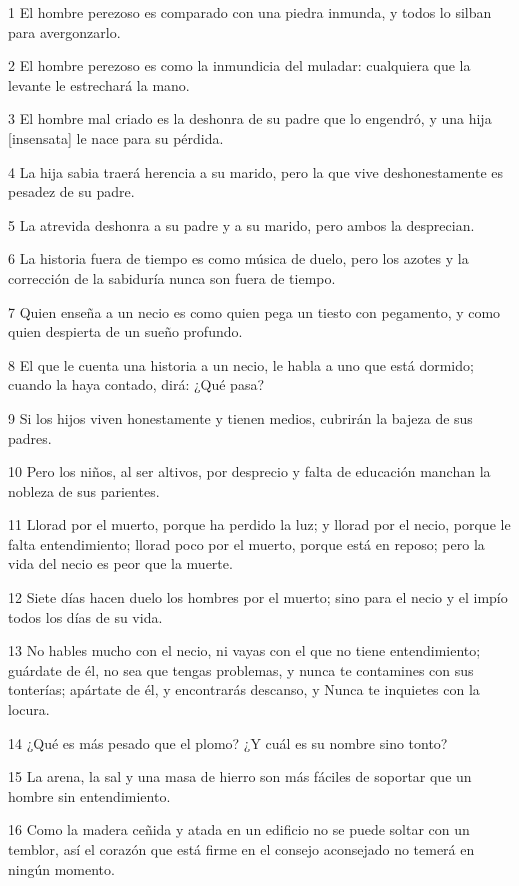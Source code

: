 \par 1 El hombre perezoso es comparado con una piedra inmunda, y todos lo silban para avergonzarlo.
\par 2 El hombre perezoso es como la inmundicia del muladar: cualquiera que la levante le estrechará la mano.
\par 3 El hombre mal criado es la deshonra de su padre que lo engendró, y una hija [insensata] le nace para su pérdida.
\par 4 La hija sabia traerá herencia a su marido, pero la que vive deshonestamente es pesadez de su padre.
\par 5 La atrevida deshonra a su padre y a su marido, pero ambos la desprecian.
\par 6 La historia fuera de tiempo es como música de duelo, pero los azotes y la corrección de la sabiduría nunca son fuera de tiempo.
\par 7 Quien enseña a un necio es como quien pega un tiesto con pegamento, y como quien despierta de un sueño profundo.
\par 8 El que le cuenta una historia a un necio, le habla a uno que está dormido; cuando la haya contado, dirá: ¿Qué pasa?
\par 9 Si los hijos viven honestamente y tienen medios, cubrirán la bajeza de sus padres.
\par 10 Pero los niños, al ser altivos, por desprecio y falta de educación manchan la nobleza de sus parientes.
\par 11 Llorad por el muerto, porque ha perdido la luz; y llorad por el necio, porque le falta entendimiento; llorad poco por el muerto, porque está en reposo; pero la vida del necio es peor que la muerte.
\par 12 Siete días hacen duelo los hombres por el muerto; sino para el necio y el impío todos los días de su vida.
\par 13 No hables mucho con el necio, ni vayas con el que no tiene entendimiento; guárdate de él, no sea que tengas problemas, y nunca te contamines con sus tonterías; apártate de él, y encontrarás descanso, y Nunca te inquietes con la locura.
\par 14 ¿Qué es más pesado que el plomo? ¿Y cuál es su nombre sino tonto?
\par 15 La arena, la sal y una masa de hierro son más fáciles de soportar que un hombre sin entendimiento.
\par 16 Como la madera ceñida y atada en un edificio no se puede soltar con un temblor, así el corazón que está firme en el consejo aconsejado no temerá en ningún momento.
